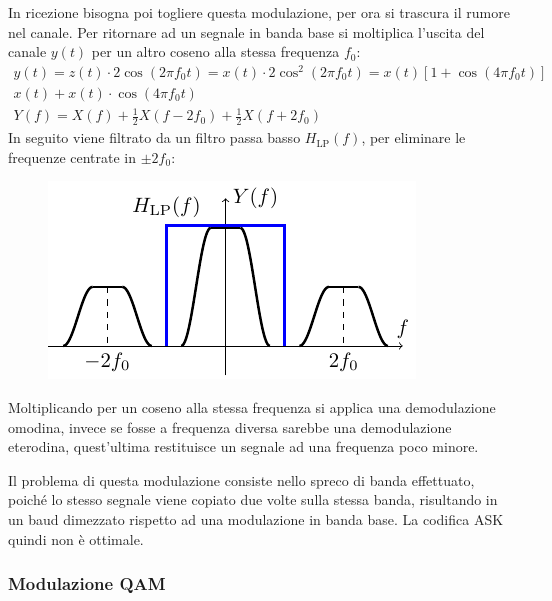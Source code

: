 \documentclass{article}
\numberwithin{equation}{subsection}
\begin{document}
In ricezione bisogna poi togliere questa modulazione, per ora si trascura il rumore nel canale. Per ritornare ad un segnale in banda base si moltiplica l'uscita del 
canale $y(t)$ per un altro coseno alla stessa frequenza $f_0$:
\begin{gather*}
    y(t)=z(t)\cdot2\cos(2\pi f_0t)=x(t)\cdot2\cos^2(2\pi f_0t)=x(t)\left[1+\cos(4\pi f_0t)\right]\\
    x(t)+x(t)\cdot\cos(4\pi f_0t)\\
    Y(f)=X(f)+\displaystyle\frac{1}{2}X(f-2f_0)+\frac{1}{2}X(f+2f_0)
\end{gather*}
In seguito viene filtrato da un filtro passa basso $H_{\mathrm{LP}}(f)$, per eliminare le frequenze centrate in $\pm2f_0$:
\begin{figure}[H]%
    \centering
    \includegraphics{modulazione-portante.pdf}
\end{figure}
Moltiplicando per un coseno alla stessa frequenza si applica una demodulazione omodina, invece se fosse a frequenza diversa sarebbe una demodulazione eterodina, quest'ultima 
restituisce un segnale ad una frequenza poco minore. 

Il problema di questa modulazione consiste nello spreco di banda effettuato, poiché lo stesso segnale viene copiato due volte sulla stessa banda, risultando in un baud 
dimezzato rispetto ad una modulazione in banda base. La codifica ASK quindi non è ottimale. 

\subsubsection{Modulazione QAM}
\end{document}

